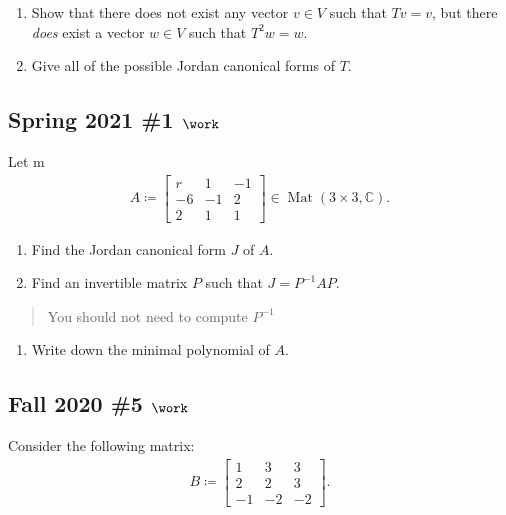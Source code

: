 \begin{enumerate}
\def\labelenumi{\alph{enumi}.}
\item
  Show that there does not exist any vector \(v\in V\) such that
  \(Tv = v\), but there \emph{does} exist a vector \(w\in V\) such that
  \(T^2 w= w\).
\item
  Give all of the possible Jordan canonical forms of \(T\).
\end{enumerate}

\hypertarget{spring-2021-1-work}{%
\subsection{\texorpdfstring{Spring 2021 \#1
\(\work\)}{Spring 2021 \#1 \textbackslash work}}\label{spring-2021-1-work}}

Let m
\begin{align*}
A \coloneqq
\begin{bmatrix}
r & 1 & -1 \\
-6 & -1 & 2 \\
2 & 1 & 1
\end{bmatrix}
\in \operatorname{Mat}(3\times 3, {\mathbb{C}})
.\end{align*}

\begin{enumerate}
\def\labelenumi{\alph{enumi}.}
\item
  Find the Jordan canonical form \(J\) of \(A\).
\item
  Find an invertible matrix \(P\) such that \(J = P ^{-1}A P\).
\end{enumerate}

\begin{quote}
You should not need to compute \(P^{-1}\)
\end{quote}

\begin{enumerate}
\def\labelenumi{\alph{enumi}.}
\setcounter{enumi}{2}
\tightlist
\item
  Write down the minimal polynomial of \(A\).
\end{enumerate}

\hypertarget{fall-2020-5-work}{%
\subsection{\texorpdfstring{Fall 2020 \#5
\(\work\)}{Fall 2020 \#5 \textbackslash work}}\label{fall-2020-5-work}}

Consider the following matrix:
\begin{align*}
B \coloneqq
\begin{bmatrix}
1 & 3 & 3
\\
2 & 2 & 3
\\
-1 & -2 & -2
\end{bmatrix}
.\end{align*}

